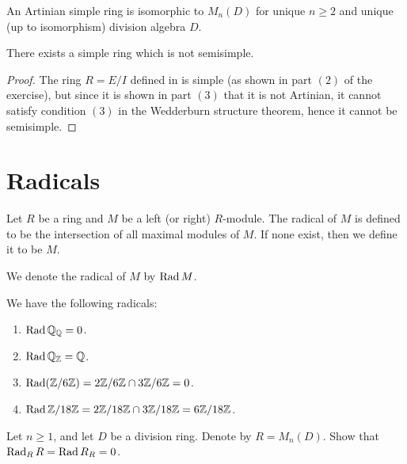 \documentclass[11pt,a4paper]{article}
\begin{document}
\begin{corollary}
  An Artinian simple ring is isomorphic to $M_n(D)$
  for unique $n \geq 2$ and unique (up to isomorphism) division algebra $D$.
\end{corollary}

\begin{corollary}
  There exists a simple ring which is not semisimple.
\end{corollary}
\begin{proof}
  The ring $R = E/I$ defined in 
  is simple (as shown in part $(2)$ of the exercise),
  but since it is shown in part $(3)$ that it is not Artinian,
  it cannot satisfy condition $(3)$ in the Wedderburn structure theorem,
  hence it cannot be semisimple.
\end{proof}

\newpage

\section{Radicals}

\begin{definition}
  Let $R$ be a ring and $M$ be a left (or right) $R$-module.
  The radical of $M$ is defined to be the intersection of all maximal
  modules of $M$.
  If none exist, then we define it to be $M$.
\end{definition}

\begin{remark}
  We denote the radical of $M$ by $\operatorname{Rad} M$.
\end{remark}

\begin{example}
  We have the following radicals:
  \begin{enumerate}
    \item[(1)] $\operatorname{Rad} \mathbb{Q}_{\mathbb{Q}} = 0$.
    \item[(2)] $\operatorname{Rad} \mathbb{Q}_{\mathbb{Z}} = \mathbb{Q}$.
    \item[(3)] $\operatorname{Rad}(\mathbb{Z}/6\mathbb{Z}) = 2\mathbb{Z}/6\mathbb{Z} \cap 3\mathbb{Z}/6\mathbb{Z} = 0$.
    \item[(4)] $\operatorname{Rad} \mathbb{Z}/18\mathbb{Z} = 2\mathbb{Z}/18\mathbb{Z} \cap 3\mathbb{Z}/18\mathbb{Z} = 6\mathbb{Z}/18\mathbb{Z}$.
  \end{enumerate}
\end{example}

\begin{exercise}
  Let $n \geq 1$, and let $D$ be a division ring.
  Denote by $R = M_n(D)$.
  Show that $\operatorname{Rad} _R R = \operatorname{Rad} R_R = 0$.
\end{exercise}
\end{document}

